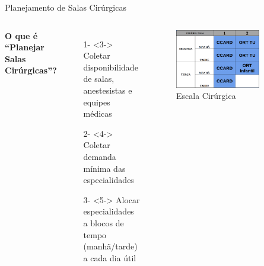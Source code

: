 \documentclass[handout]{beamer}
\begin{document}
\begin{frame}{Planejamento de Salas Cirúrgicas}
    \begin{columns}[t]
        \textbf{O que é ``Planejar Salas Cirúrgicas''?}
        \begin{enumerate}
            \setlength\itemsep{.5em}
            \item[1-]<3-> Coletar disponibilidade de salas, anestesistas e equipes médicas
            \item[2-]<4-> Coletar demanda mínima das especialidades
            \item[3-]<5-> Alocar especialidades a blocos de tempo (manhã/tarde) a cada dia útil
        \end{enumerate}
        \begin{figure}
            \centering
            \includegraphics[width=0.8\textwidth]{images/schedule.png}
            \caption{Escala Cirúrgica\label{fig:schedule}}
        \end{figure}
    \end{columns}
\end{frame}
\end{document}
